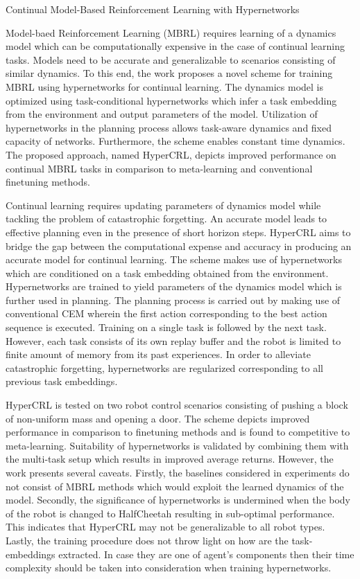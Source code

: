 \documentclass[11pt,letterpaper]{article}
\begin{document}
\begin{center}
  \large{Continual Model-Based Reinforcement Learning with Hypernetworks}
\end{center}

Model-baed Reinforcement Learning (MBRL) requires learning of a dynamics model which can be computationally expensive in the case of continual learning tasks. Models need to be accurate and generalizable to scenarios consisting of similar dynamics. To this end, the work proposes a novel scheme for training MBRL using hypernetworks for continual learning. The dynamics model is optimized using task-conditional hypernetworks which infer a task embedding from the environment and output parameters of the model. Utilization of hypernetworks in the planning process allows task-aware dynamics and fixed capacity of networks. Furthermore, the scheme enables constant time dynamics. The proposed approach, named HyperCRL, depicts improved performance on continual MBRL tasks in comparison to meta-learning and conventional finetuning methods. 

Continual learning requires updating parameters of dynamics model while tackling the problem of catastrophic forgetting. An accurate model leads to effective planning even in the presence of short horizon steps. HyperCRL aims to bridge the gap between the computational expense and accuracy in producing an accurate model for continual learning. The scheme makes use of hypernetworks which are conditioned on a task embedding obtained from the environment. Hypernetworks are trained to yield parameters of the dynamics model which is further used in planning. The planning process is carried out by making use of conventional CEM wherein the first action corresponding to the best action sequence is executed. Training on a single task is followed by the next task. However, each task consists of its own replay buffer and the robot is limited to finite amount of memory from its past experiences. In order to alleviate catastrophic forgetting, hypernetworks are regularized corresponding to all previous task embeddings. 

HyperCRL is tested on two robot control scenarios consisting of pushing a block of non-uniform mass and opening a door. The scheme depicts improved performance in comparison to finetuning methods and is found to competitive to meta-learning. Suitability of hypernetworks is validated by combining them with the multi-task setup which results in improved average returns. However, the work presents several caveats. Firstly, the baselines considered in experiments do not consist of MBRL methods which would exploit the learned dynamics of the model. Secondly, the significance of hypernetworks is undermined when the body of the robot is changed to HalfCheetah resulting in sub-optimal performance. This indicates that HyperCRL may not be generalizable to all robot types. Lastly, the training procedure does not throw light on how are the task-embeddings extracted. In case they are one of agent's components then their time complexity should be taken into consideration when training hypernetworks. 
\end{document}

